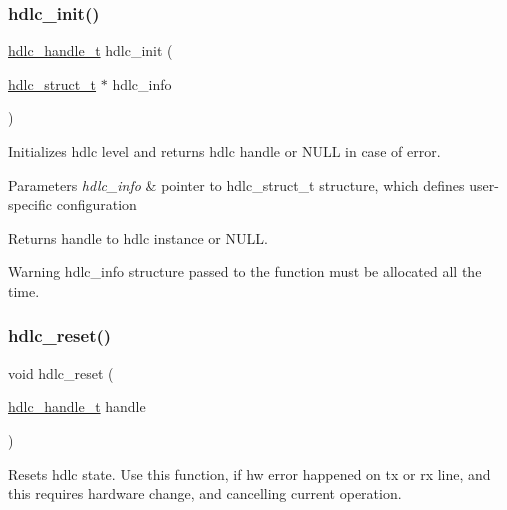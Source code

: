 \subsubsection{\texorpdfstring{hdlc\+\_\+init()}{hdlc\_init()}}
{\footnotesize\ttfamily \hyperlink{group__HDLC__API_gabeaf7578aed5279d3af891bd85a9f961}{hdlc\+\_\+handle\+\_\+t} hdlc\+\_\+init (\begin{DoxyParamCaption}\item[{\hyperlink{group__HDLC__API_ga4537a8665b2abe023cb7fe40ea1bd024}{hdlc\+\_\+struct\+\_\+t} $\ast$}]{hdlc\+\_\+info }\end{DoxyParamCaption})}

Initializes hdlc level and returns hdlc handle or N\+U\+LL in case of error.


\begin{DoxyParams}{Parameters}
{\em hdlc\+\_\+info} & pointer to hdlc\+\_\+struct\+\_\+t structure, which defines user-\/specific configuration \\
\hline
\end{DoxyParams}
\begin{DoxyReturn}{Returns}
handle to hdlc instance or N\+U\+LL. 
\end{DoxyReturn}
\begin{DoxyWarning}{Warning}
hdlc\+\_\+info structure passed to the function must be allocated all the time. 
\end{DoxyWarning}
\mbox{\label{group__HDLC__API_ga532836280097de1c8881df8336f21075}} 
\subsubsection{\texorpdfstring{hdlc\+\_\+reset()}{hdlc\_reset()}}
{\footnotesize\ttfamily void hdlc\+\_\+reset (\begin{DoxyParamCaption}\item[{\hyperlink{group__HDLC__API_gabeaf7578aed5279d3af891bd85a9f961}{hdlc\+\_\+handle\+\_\+t}}]{handle }\end{DoxyParamCaption})}

Resets hdlc state. Use this function, if hw error happened on tx or rx line, and this requires hardware change, and cancelling current operation.


